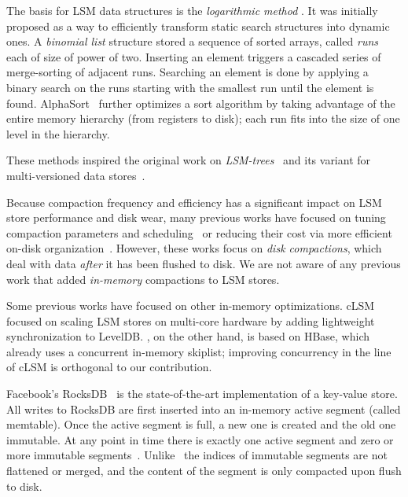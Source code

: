 The basis for LSM data structures is the \emph{logarithmic
method} \cite{Bentley79}.
It was initially
proposed as a way to efficiently transform static search structures into dynamic ones.
A \emph{binomial list} structure stored a sequence of sorted arrays, called
\emph{runs} each of size of power of two. Inserting an element triggers a
cascaded series of merge-sorting of adjacent runs. Searching an
element is done by applying a binary search on the runs starting with the
smallest run until the element is found.
AlphaSort~\cite{Nyberg95} further optimizes a sort algorithm by taking advantage of the entire memory hierarchy (from registers to disk); each run fits into the size of one level in the hierarchy.

These methods inspired the original work on
\emph{LSM-trees}~\cite{O'Neil1996} and its variant for multi-versioned
data stores~\cite{Muth1998}. 




Because compaction frequency and efficiency has a significant impact on LSM store performance and disk wear, 
many previous works have focused on tuning compaction parameters and scheduling~\cite{hbasetuning,rocksdb,
scylladbcompaction,universalcompaction,Sears:2012} or reducing their cost via more efficient on-disk organization~\cite{wisckey}. 
However, these works focus on \emph{disk compactions},
which deal with data \emph{after} it has been flushed to disk. We are not aware of any previous work that 
added \emph{in-memory} compactions to LSM stores.

Some previous works have focused on other in-memory optimizations. 
cLSM~\cite{clsm} focused on scaling LSM stores on multi-core hardware by adding lightweight synchronization to LevelDB. 
\sys, on the other hand, is based on HBase, which already uses a concurrent in-memory skiplist; improving concurrency
in the line of cLSM is orthogonal to our contribution.  

Facebook's RocksDB~\cite{rocksdb} is the state-of-the-art implementation of a key-value store.
All writes to RocksDB are first inserted into an in-memory active segment (called memtable). Once the active segment is full, a new one is created and the old one immutable. At any point in time there is exactly one active segment and zero or more immutable segments~\cite{rocksdbtuning}. Unlike \sys\ the indices of immutable segments are not flattened or merged, and the content of the segment is only compacted upon flush to disk.

